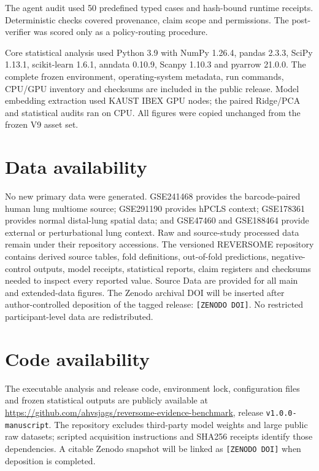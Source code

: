 \documentclass[11pt]{article}
\begin{document}
The agent audit used 50 predefined typed cases and hash-bound runtime receipts. Deterministic checks covered provenance, claim scope and permissions. The post-verifier was scored only as a policy-routing procedure.

Core statistical analysis used Python 3.9 with NumPy 1.26.4, pandas 2.3.3, SciPy 1.13.1, scikit-learn 1.6.1, anndata 0.10.9, Scanpy 1.10.3 and pyarrow 21.0.0. The complete frozen environment, operating-system metadata, run commands, CPU/GPU inventory and checksums are included in the public release. Model embedding extraction used KAUST IBEX GPU nodes; the paired Ridge/PCA and statistical audits ran on CPU. All figures were copied unchanged from the frozen V9 asset set.

\section*{Data availability}

No new primary data were generated. GSE241468 provides the barcode-paired human lung multiome source; GSE291190 provides hPCLS context; GSE178361 provides normal distal-lung spatial data; and GSE47460 and GSE188464 provide external or perturbational lung context. Raw and source-study processed data remain under their repository accessions. The versioned REVERSOME repository contains derived source tables, fold definitions, out-of-fold predictions, negative-control outputs, model receipts, statistical reports, claim registers and checksums needed to inspect every reported value. Source Data are provided for all main and extended-data figures. The Zenodo archival DOI will be inserted after author-controlled deposition of the tagged release: \texttt{[ZENODO DOI]}. No restricted participant-level data are redistributed.

\section*{Code availability}

The executable analysis and release code, environment lock, configuration files and frozen statistical outputs are publicly available at \url{https://github.com/ahvsjags/reversome-evidence-benchmark}, release \texttt{v1.0.0-manuscript}. The repository excludes third-party model weights and large public raw datasets; scripted acquisition instructions and SHA256 receipts identify those dependencies. A citable Zenodo snapshot will be linked as \texttt{[ZENODO DOI]} when deposition is completed.
\end{document}

